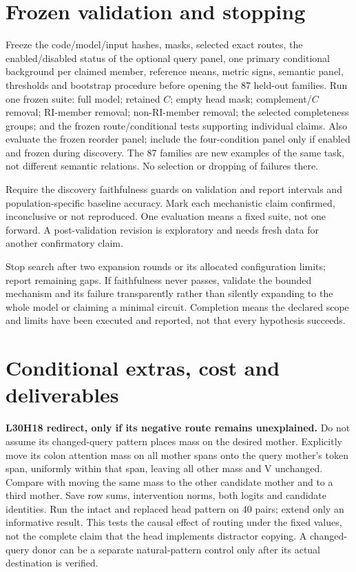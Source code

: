 \documentclass[11pt,a4paper]{article}
\begin{document}
\section{Frozen validation and stopping}
\label{sec:validation}
Freeze the code/model/input hashes, masks, selected exact routes, the enabled/disabled status of the optional query panel, one primary
conditional background per claimed member, reference means, metric signs, semantic
panel, thresholds and bootstrap procedure before opening the 87 held-out families.
Run one frozen suite: full model; retained $C$; empty head mask; complement/$C$
removal; RI-member removal; non-RI-member removal; the selected completeness groups;
and the frozen route/conditional tests supporting individual claims. Also evaluate the frozen reorder panel; include the four-condition panel only if enabled and frozen during discovery. The 87 families are new examples of the same
task, not different semantic relations. No selection or dropping of failures there.

Require the discovery faithfulness guards on validation and report intervals and
population-specific baseline accuracy. Mark each mechanistic claim confirmed,
inconclusive or not reproduced. One evaluation means a fixed suite, not one forward.
A post-validation revision is exploratory and needs fresh data for another
confirmatory claim.

Stop search after two expansion rounds or its allocated configuration limits;
report remaining gaps. If faithfulness never passes, validate the bounded mechanism
and its failure transparently rather than silently expanding to the whole model or
claiming a minimal circuit. Completion means the declared scope and limits have
been executed and reported, not that every hypothesis succeeds.

\section{Conditional extras, cost and deliverables}
\textbf{L30H18 redirect, only if its negative route remains unexplained.} Do not assume
its changed-query pattern places mass on the desired mother. Explicitly move its
colon attention mass on all mother spans onto the query mother's token span,
uniformly within that span, leaving all other mass and V unchanged. Compare with
moving the same mass to the other candidate mother and to a third mother. Save row
sums, intervention norms, both logits and candidate identities. Run the intact and
replaced head pattern on 40 pairs; extend only an informative result. This tests
the causal effect of routing under the fixed values, not the complete claim that
the head implements distractor copying. A changed-query donor can be a separate
natural-pattern control only after its actual destination is verified.
\end{document}
